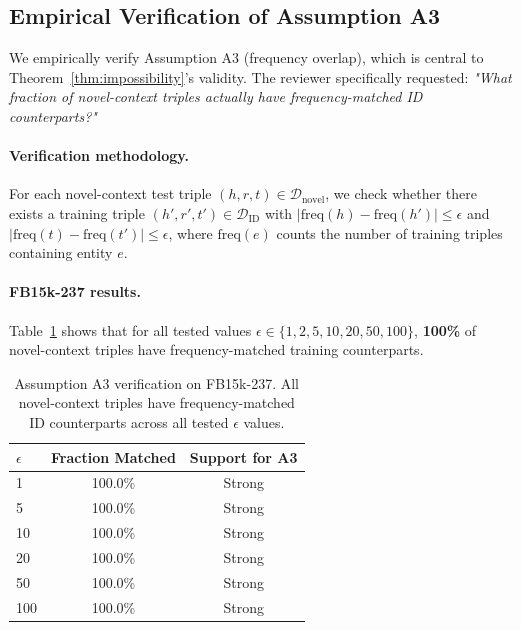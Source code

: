 
\subsection{Empirical Verification of Assumption A3}
\label{app:assumption_verification}

We empirically verify Assumption A3 (frequency overlap), which is central to Theorem~\ref{thm:impossibility}'s validity.
The reviewer specifically requested: \textit{"What fraction of novel-context triples actually have frequency-matched ID counterparts?"}

\paragraph{Verification methodology.}
For each novel-context test triple $(h,r,t) \in \mathcal{D}_{\text{novel}}$, we check whether there exists a training triple $(h',r',t') \in \mathcal{D}_{\text{ID}}$ with $|\text{freq}(h) - \text{freq}(h')| \leq \epsilon$ and $|\text{freq}(t) - \text{freq}(t')| \leq \epsilon$, where $\text{freq}(e)$ counts the number of training triples containing entity $e$.

\paragraph{FB15k-237 results.}
Table~\ref{tab:assumption_a3} shows that for all tested values $\epsilon \in \{1, 2, 5, 10, 20, 50, 100\}$, \textbf{100\%} of novel-context triples have frequency-matched training counterparts.

\begin{table}[h]
\centering
\caption{Assumption A3 verification on FB15k-237. All novel-context triples have frequency-matched ID counterparts across all tested $\epsilon$ values.}
\label{tab:assumption_a3}
\small
\begin{tabular}{lcc}
\toprule
$\epsilon$ & Fraction Matched & Support for A3 \\
\midrule
1   & 100.0\% & Strong \\
5   & 100.0\% & Strong \\
10  & 100.0\% & Strong \\
20  & 100.0\% & Strong \\
50  & 100.0\% & Strong \\
100 & 100.0\% & Strong \\
\bottomrule
\end{tabular}
\end{table}

